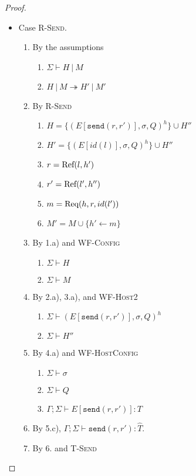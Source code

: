 \begin{proof}
\begin{itemize}
\item Case \textsc{R-Send}.
\begin{enumerate}
\item By the assumptions
  \begin{enumerate}[label=(\alph*)]
  \item $\Sigma \vdash H~|~M$
  \item $H~|~M \twoheadrightarrow H'~|~M'$
  \end{enumerate}
\item By \textsc{R-Send}
  \begin{enumerate}[label=(\alph*)]
  \item $H = \{ (E[\texttt{send}(r, r')], \sigma, Q)^h \} \cup H''$
  \item $H' = \{ (E[id(l)], \sigma, Q)^h \} \cup H''$
  \item $r  = {\textrm{Ref}(l, h')}$
  \item $r' = {\textrm{Ref}(l', h'')}$
  \item $m  = {\textrm{Req}(h, r, id(l'))}$
  \item $M' = M \cup \{ h' \leftarrow m \}$
  \end{enumerate}
\item By 1.a) and \textsc{WF-Config}
  \begin{enumerate}[label=(\alph*)]
  \item $\Sigma \vdash H$
  \item $\Sigma \vdash M$
  \end{enumerate}
\item By 2.a), 3.a), and \textsc{WF-Host2}
  \begin{enumerate}[label=(\alph*)]
  \item $\Sigma \vdash (E[\texttt{send}(r, r')], \sigma, Q)^h$ 
  \item $\Sigma \vdash H''$
  \end{enumerate}
\item By 4.a) and \textsc{WF-HostConfig}
  \begin{enumerate}[label=(\alph*)]
  \item $\Sigma \vdash \sigma$
  \item $\Sigma \vdash Q$
  \item $\Gamma ; \Sigma \vdash E[\texttt{send}(r, r')] : T$
  \end{enumerate}
\item By 5.c), $\Gamma ; \Sigma \vdash \texttt{send}(r, r') : \hat{T}$.
\item By 6. and \textsc{T-Send}
  \begin{enumerate}[label=(\alph*)]

\end{enumerate}
\end{enumerate}
\end{itemize}
\end{proof}
